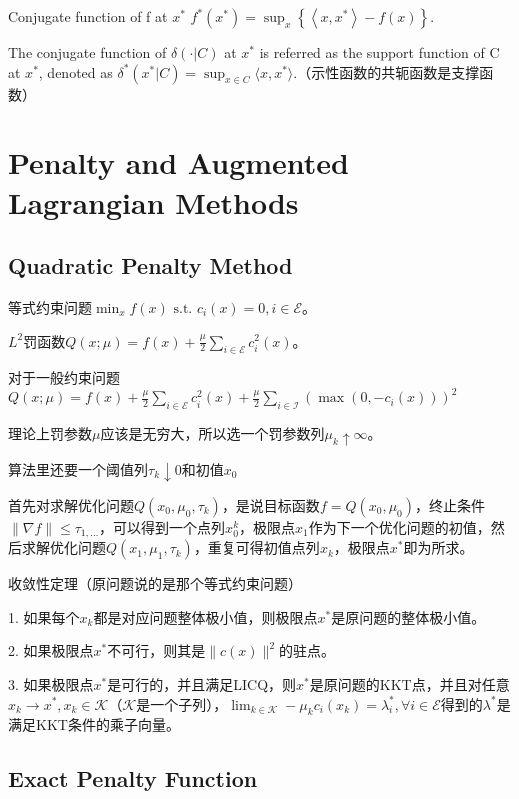 Conjugate function of f at $x^{*}$ $f^{*}\left(x^{*}\right)=\sup _{x}\left\{\left\langle x, x^{*}\right\rangle-f(x)\right\}$.

The conjugate function of $\delta(\cdot | C)$ at $x^{*}$ is referred as the support function of C at  $x^{*}$, denoted as $\delta^{*}(x^{*} | C) = \sup_{x \in C} \langle x, x^{\ast} \rangle$.（示性函数的共轭函数是支撑函数）

\section{Penalty and Augmented
Lagrangian Methods}

\subsection{Quadratic Penalty Method}

等式约束问题$\min_{x} f(x) \text { s.t. } c_{i}(x)=0, i \in \mathcal{E}$。

$L^2$罚函数$Q(x; \mu) = f(x)+\frac{\mu}{2} \sum_{i \in \mathcal{E}} c_{i}^{2}(x)$。

对于一般约束问题$Q(x ; \mu)=f(x)+\frac{\mu}{2} \sum_{i \in \mathcal{E}} c_{i}^{2}(x)+\frac{\mu}{2} \sum_{i \in \mathcal{I}}\left(\max \left(0,-c_{i}(x)\right)\right)^{2}$

理论上罚参数$\mu$应该是无穷大，所以选一个罚参数列$\mu_k \uparrow \infty$。

算法里还要一个阈值列$\tau_k \downarrow 0$和初值$x_0$

首先对求解优化问题$Q(x_0, \mu_0, \tau_k)$，是说目标函数$f = Q(x_0, \mu_0)$，终止条件$\|\nabla f\| \le \tau_{1, \dots}$，可以得到一个点列$x_0^k$，极限点$x_1$作为下一个优化问题的初值，然后求解优化问题$Q(x_1, \mu_1, \tau_k)$，重复可得初值点列$x_k$，极限点$x^{\ast}$即为所求。

收敛性定理（原问题说的是那个等式约束问题）

1. 如果每个$x_k$都是对应问题整体极小值，则极限点$x^{\ast}$是原问题的整体极小值。

2. 如果极限点$x^{\ast}$不可行，则其是$\|c(x)\|^2$的驻点。

3. 如果极限点$x^{\ast}$是可行的，并且满足LICQ，则$x^{\ast}$是原问题的KKT点，并且对任意$x_k \to x^{\ast}, x_k \in \mathcal{K}$（$\mathcal{K}$是一个子列），$\lim_{k \in \mathcal{K}}-\mu_{k} c_{i}\left(x_{k}\right)=\lambda_{i}^{*}, \forall i \in \mathcal{E}$得到的$\lambda^{\ast}$是满足KKT条件的乘子向量。

\subsection{Exact Penalty Function}

